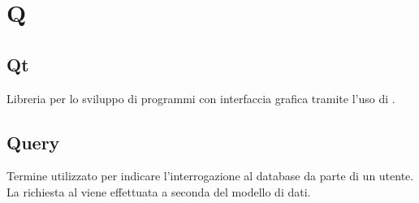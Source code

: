\section*{Q}
\markright{}

\subsection*{Qt}
Libreria  per lo sviluppo di programmi con interfaccia grafica tramite l'uso di .

\subsection*{Query} 
Termine utilizzato per indicare l'interrogazione al database da parte di un utente. La richiesta al  viene effettuata a seconda del modello di dati.